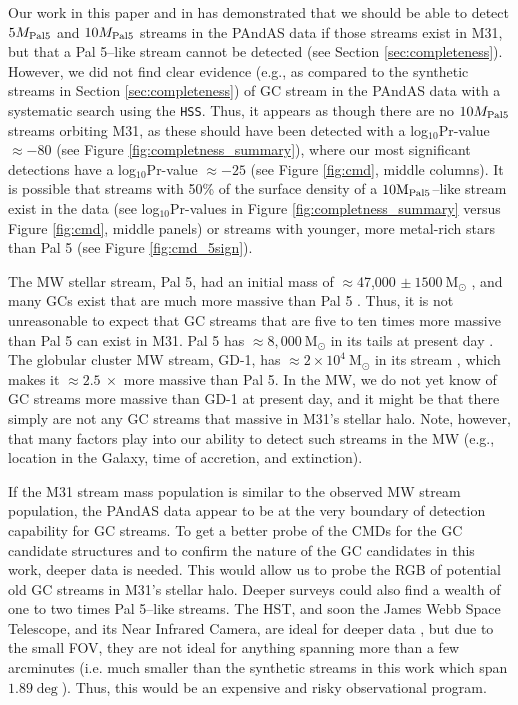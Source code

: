 \documentclass[twocolumn]{aastex631}
\newcommand{\msun}{\textrm{M}_\odot}
\begin{document}
Our work in this paper and in  has demonstrated that we should be able to detect $5{M}_{\rm Pal 5}$ and $10{M}_{\rm Pal 5}$ streams in the PAndAS data if those streams exist in M31, but that a Pal 5--like stream cannot be detected (see Section \ref{sec:completeness}). However, we did not find clear evidence (e.g., as compared to the synthetic streams in Section \ref{sec:completeness}) of GC stream in the PAndAS data with a systematic search using the \texttt{HSS}. Thus, it appears as though there are no $10{M}_{\rm Pal 5}$ streams orbiting M31, as these should have been detected with a log$_{10}$Pr-value  ${\approx}-80$ (see Figure \ref{fig:completness_summary}), where our most significant detections have a log$_{10}$Pr-value ${\approx}-25$ (see Figure \ref{fig:cmd}, middle columns). It is possible that streams with 50\% of the surface density of a $10{\rm M}_{\rm Pal 5}$--like stream exist in the data (see log$_{10}$Pr-values in Figure  \ref{fig:completness_summary} versus Figure  \ref{fig:cmd}, middle panels) or streams with younger, more metal-rich stars than Pal 5 (see Figure \ref{fig:cmd_5sign}).

The MW stellar stream, Pal 5, had an initial mass of $\approx$47,000 $\pm~ 1500~ \msun$ \citep{ibata17}, and many GCs exist that are much more massive than Pal 5 \citep[see e.g.,][]{harris96,ibata19}. Thus, it is not unreasonable to expect that GC streams that are five to ten times more massive than Pal 5 can exist in M31. Pal 5 has $\approx8,000~ \msun$ in its tails at present day \citep{ibata16,ibata17}. The globular cluster MW stream, GD-1, has ${\approx}2 \times 10^{4}~ \msun$ in its stream \citep[][]{koposov10}, which makes it ${\approx}2.5~ \times$ more massive than Pal 5. In the MW, we do not yet know of GC streams more massive than GD-1 at present day, and it might be that there simply are not any GC streams that massive in M31's stellar halo. Note, however, that many factors play into our ability to detect such streams in the MW (e.g., location in the Galaxy, time of accretion, and extinction). 


If the M31 stream mass population is similar to the observed MW stream population, the PAndAS data appear to be at the very boundary of detection capability for GC streams. 
To get a better probe of the CMDs for the GC candidate structures and to confirm the nature of the GC candidates in this work, deeper data is needed. This would allow us to probe the RGB of potential old GC streams in M31's stellar halo. Deeper surveys could also find a wealth of one to two times Pal 5--like streams. The HST, and soon the James Webb Space Telescope, and its Near Infrared Camera, are ideal for deeper data \citep[e.g.,][]{huxor14}, but due to the small FOV, they are not ideal for anything spanning more than a few arcminutes (i.e. much smaller than the synthetic streams in this work which span $1.89 \deg$). Thus, this would be an expensive and risky observational program.  
\end{document}
